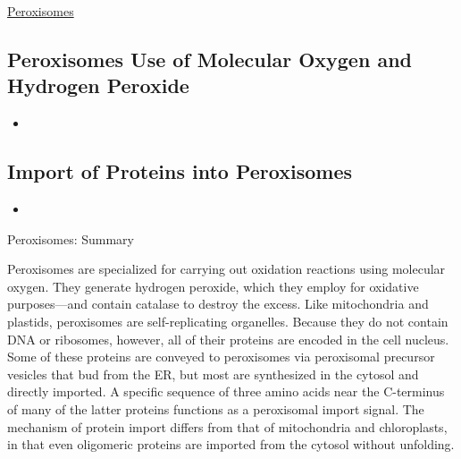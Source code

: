 \documentclass[12pt,letterpaper]{article}
\begin{document}
\hypertarget{12.4}{}
\begin{secbox}{\hyperlink{12}{Peroxisomes}}{
    \hypertarget{12.4.1}{\subsection*{Peroxisomes Use of Molecular Oxygen and Hydrogen Peroxide}}
    \begin{itemize}
        \item
    \end{itemize}

    \hypertarget{12.4.2}{\subsection*{Import of Proteins into Peroxisomes}}
    \begin{itemize}
        \item
    \end{itemize}

    \hypertarget{12.4.r}{}
    \begin{probbox}{Peroxisomes: Summary}\end{probbox}
    Peroxisomes are specialized for carrying out oxidation reactions using molecular oxygen. They generate hydrogen peroxide, which they employ for oxidative purposes—and contain catalase to destroy the excess. Like mitochondria and plastids, peroxisomes are self-replicating organelles. Because they do not contain DNA or ribosomes, however, all of their proteins are encoded in the cell nucleus. Some of these proteins are conveyed to peroxisomes via peroxisomal precursor vesicles that bud from the ER, but most are synthesized in the cytosol and directly imported. A specific sequence of three amino acids near the C-terminus of many of the latter proteins functions as a peroxisomal import signal. The mechanism of protein import differs from that of mitochondria and chloroplasts, in that even oligomeric proteins are imported from the cytosol without unfolding.
}\end{secbox}
\end{document}
